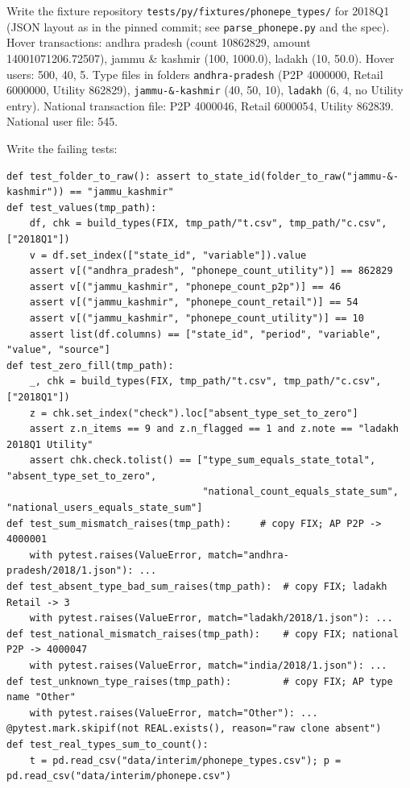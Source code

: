 \documentclass[10pt,a4paper]{article}
\newcommand{\f}[1]{\texttt{#1}}
\begin{document}
\begin{steps}
\item Write the fixture repository \f{tests/py/fixtures/phonepe\_types/} for 2018Q1 (JSON layout as in the pinned
      commit; see \f{parse\_phonepe.py} and the spec). Hover transactions: andhra pradesh (count 10862829,
      amount 14001071206.72507), jammu \& kashmir (100, 1000.0), ladakh (10, 50.0). Hover users: 500, 40, 5.
      Type files in folders \f{andhra-pradesh} (P2P 4000000, Retail 6000000, Utility 862829),
      \f{jammu-\&-kashmir} (40, 50, 10), \f{ladakh} (6, 4, no Utility entry). National transaction file: P2P
      4000046, Retail 6000054, Utility 862839. National user file: 545.
\item Write the failing tests:
\begin{verbatim}
def test_folder_to_raw(): assert to_state_id(folder_to_raw("jammu-&-kashmir")) == "jammu_kashmir"
def test_values(tmp_path):
    df, chk = build_types(FIX, tmp_path/"t.csv", tmp_path/"c.csv", ["2018Q1"])
    v = df.set_index(["state_id", "variable"]).value
    assert v[("andhra_pradesh", "phonepe_count_utility")] == 862829
    assert v[("jammu_kashmir", "phonepe_count_p2p")] == 46
    assert v[("jammu_kashmir", "phonepe_count_retail")] == 54
    assert v[("jammu_kashmir", "phonepe_count_utility")] == 10
    assert list(df.columns) == ["state_id", "period", "variable", "value", "source"]
def test_zero_fill(tmp_path):
    _, chk = build_types(FIX, tmp_path/"t.csv", tmp_path/"c.csv", ["2018Q1"])
    z = chk.set_index("check").loc["absent_type_set_to_zero"]
    assert z.n_items == 9 and z.n_flagged == 1 and z.note == "ladakh 2018Q1 Utility"
    assert chk.check.tolist() == ["type_sum_equals_state_total", "absent_type_set_to_zero",
                                  "national_count_equals_state_sum", "national_users_equals_state_sum"]
def test_sum_mismatch_raises(tmp_path):     # copy FIX; AP P2P -> 4000001
    with pytest.raises(ValueError, match="andhra-pradesh/2018/1.json"): ...
def test_absent_type_bad_sum_raises(tmp_path):  # copy FIX; ladakh Retail -> 3
    with pytest.raises(ValueError, match="ladakh/2018/1.json"): ...
def test_national_mismatch_raises(tmp_path):    # copy FIX; national P2P -> 4000047
    with pytest.raises(ValueError, match="india/2018/1.json"): ...
def test_unknown_type_raises(tmp_path):         # copy FIX; AP type name "Other"
    with pytest.raises(ValueError, match="Other"): ...
@pytest.mark.skipif(not REAL.exists(), reason="raw clone absent")
def test_real_types_sum_to_count():
    t = pd.read_csv("data/interim/phonepe_types.csv"); p = pd.read_csv("data/interim/phonepe.csv")

\end{verbatim}
\end{steps}
\end{document}

